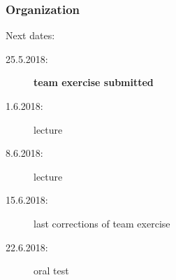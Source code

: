 


\date{25.5.2018}



\renewcommand{\enquote}[1]{\emph{``#1''}} %

\begin{frame}
	\titlepage
	\doclicenseThis
\end{frame}

\begin{frame}
	\frametitle{Organization}
	Next dates:
	\begin{description}
		\item[25.5.2018:] \textbf{team exercise submitted}
		\item[1.6.2018:] lecture
		\item[8.6.2018:] lecture
		\item[15.6.2018:] last corrections of team exercise
		\item[22.6.2018:] oral test
	\end{description}
\end{frame}


